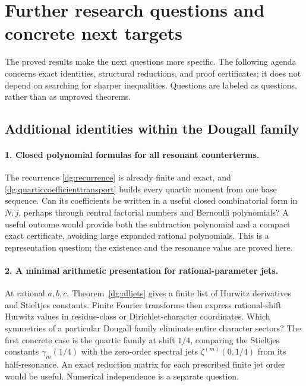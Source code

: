 \section{Further research questions and concrete next targets}
\label{sec:questions}

The proved results make the next questions more specific. The following
agenda concerns exact identities, structural reductions, and proof
certificates; it does not depend on searching for sharper inequalities.
Questions are labeled as questions, rather than as unproved theorems.

\subsection{Additional identities within the Dougall family}

\paragraph{1. Closed polynomial formulas for all resonant counterterms.}
The recurrence \eqref{dg:recurrence} is already finite and exact, and
\eqref{dg:quarticcoefficienttransport} builds every quartic moment
from one base sequence. Can its coefficients be written in a useful
closed combinatorial form in $N,j$, perhaps through central factorial
numbers and Bernoulli polynomials? A useful outcome would provide both
the subtraction polynomial and a compact exact certificate, avoiding
large expanded rational polynomials. This is a representation question;
the existence and the resonance value are proved here.

\paragraph{2. A minimal arithmetic presentation for rational-parameter jets.}
At rational $a,b,c$, Theorem~\ref{dg:alljets} gives a finite list of
Hurwitz derivatives and Stieltjes constants. Finite Fourier transforms
then express rational-shift Hurwitz values in residue-class or
Dirichlet-character coordinates. Which symmetries of a particular
Dougall family eliminate entire character sectors? The first concrete
case is the quartic family at shift $1/4$, comparing the Stieltjes
constants $\gamma_m(1/4)$ with the zero-order spectral jets
$\zeta^{(m)}(0,1/4)$ from its half-resonance. An exact reduction matrix
for each prescribed finite jet order would be useful. Numerical
independence is a separate question.

